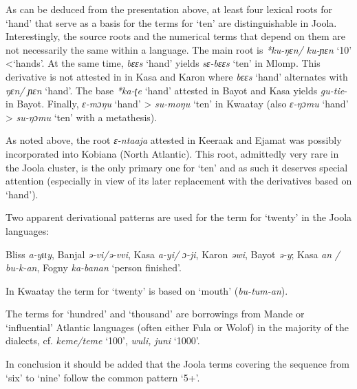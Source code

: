 As can be deduced from the presentation above, at least four lexical roots for ‘hand’ that serve as a basis for the terms for ‘ten’ are distinguishable in Joola. Interestingly, the source roots and the numerical terms that depend on them are not necessarily the same within a language. The main root is \textit{*ku-ŋɛn/} \textit{ku-ɲɛn} ‘10’ <‘hands’. At the same time, \textit{bɛɛs} ‘hand’ yields \textit{sɛ-bɛɛs} ‘ten’ in Mlomp. This derivative is not attested in in Kasa and Karon where \textit{bɛɛs} ‘hand’ alternates with \textit{ŋɛn/} \textit{ɲɛn} ‘hand’. The base \textit{*ka-ʈe} ‘hand’ attested in Bayot and Kasa yields \textit{gu-tie}- in Bayot. Finally, \textit{ɛ-mɔŋu} ‘hand’ > \textit{su-moŋu} ‘ten’ in Kwaatay (also \textit{ɛ-ŋɔmu} ‘hand’ > \textit{su-ŋɔmu} ‘ten’ with a metathesis).

As noted above, the root \textit{ɛ-ntaaja} attested in Keeraak and Ejamat was possibly incorporated into Kobiana (North Atlantic). This root, admittedly very rare in the Joola cluster, is the only primary one for ‘ten’ and as such it deserves special attention (especially in view of its later replacement with the derivatives based on ‘hand’). 


Two apparent derivational patterns are used for the term for ‘twenty’ in the Joola languages:

\begin{exe}
 Bliss \textit{a-yɩɩy}, Banjal \textit{ə-vi/ə-vvi}, Kasa \textit{a-yi/} \textit{ɔ-ji}, Karon \textit{əwi}, Bayot \textit{ə-y};
 Kasa \textit{an} \textit{/} \textit{bu-k-an}, Fogny \textit{ka-banan} ‘person finished’.
\end{exe}


In Kwaatay the term for ‘twenty’ is based on ‘mouth’ (\textit{bu-tum-an}).

The terms for ‘hundred’ and ‘thousand’ are borrowings from Mande or ‘influential’ Atlantic languages (often either Fula or Wolof) in the majority of the dialects, cf. \textit{keme/teme} ‘100’, \textit{wuli,} \textit{juni} ‘1000’.

In conclusion it should be added that the Joola terms covering the sequence from ‘six’ to ‘nine’ follow the common pattern ‘5+’.

